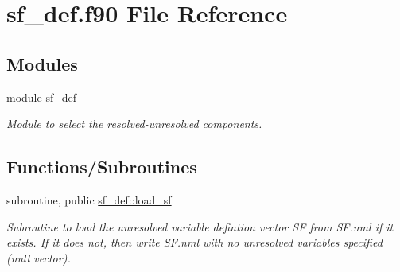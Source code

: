 \hypertarget{sf__def_8f90}{}\section{sf\+\_\+def.\+f90 File Reference}
\label{sf__def_8f90}
\subsection*{Modules}
\begin{DoxyCompactItemize}
\item 
module \hyperlink{namespacesf__def}{sf\+\_\+def}
\begin{DoxyCompactList}\small\item\em Module to select the resolved-\/unresolved components. \end{DoxyCompactList}\end{DoxyCompactItemize}
\subsection*{Functions/\+Subroutines}
\begin{DoxyCompactItemize}
\item 
subroutine, public \hyperlink{namespacesf__def_aefac3d4682ec35c401bb888b10dc4f47}{sf\+\_\+def\+::load\+\_\+sf}
\begin{DoxyCompactList}\small\item\em Subroutine to load the unresolved variable defintion vector {\ttfamily SF} from S\+F.\+nml if it exists. If it does not, then write S\+F.\+nml with no unresolved variables specified (null vector). \end{DoxyCompactList}\end{DoxyCompactItemize}
